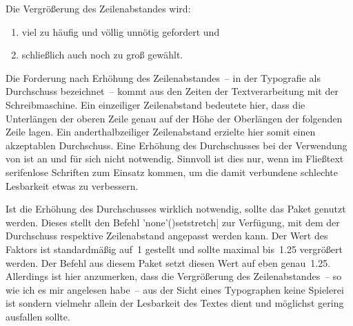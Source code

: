 \begin{DeclarePackages}[Typografie]
  Die Vergrößerung des Zeilenabstandes wird:
  \begin{enumerate}[itemindent=0pt,labelwidth=*,labelsep=1em,label=\Roman*.]
  \item viel zu häufig und völlig unnötig gefordert und
  \item schließlich auch noch zu groß gewählt.
  \end{enumerate}
  
  Die Forderung nach Erhöhung des Zeilenabstandes~-- in der Typografie als 
  Durchschuss bezeichnet~-- kommt aus den Zeiten der Textverarbeitung mit der 
  Schreibmaschine. Ein einzeiliger Zeilenabstand bedeutete hier, dass die 
  Unterlängen der oberen Zeile genau auf der Höhe der Oberlängen der folgenden 
  Zeile lagen. Ein anderthalbzeiliger Zeilenabstand erzielte hier somit einen 
  akzeptablen Durchschuss. Eine Erhöhung des Durchschusses bei der Verwendung 
  von  ist an und für sich nicht notwendig. Sinnvoll ist dies 
  nur, wenn im Fließtext serifenlose Schriften zum Einsatz kommen, um die damit 
  verbundene schlechte Lesbarkeit etwas zu verbessern.
  
  Ist die Erhöhung des Durchschusses wirklich notwendig, sollte das Paket 
   genutzt werden. Dieses stellt den Befehl 
  \Macro'none'(){setstretch|} zur 
  Verfügung, mit dem der Durchschuss respektive Zeilenabstand angepasst werden 
  kann. Der Wert des Faktors ist standardmäßig auf~1 gestellt und sollte 
  maximal bis~1.25 vergrößert werden. Der Befehl  aus 
  diesem Paket setzt diesen Wert auf eben genau~1.25. Allerdings ist hier 
  anzumerken, dass die Vergrößerung des Zeilenabstandes~-- so wie ich es mir 
  angelesen habe~-- aus der Sicht eines Typographen keine Spielerei ist sondern 
  vielmehr allein der Lesbarkeit des Textes dient und möglichst gering 
  ausfallen sollte.
  

\end{DeclarePackages}
